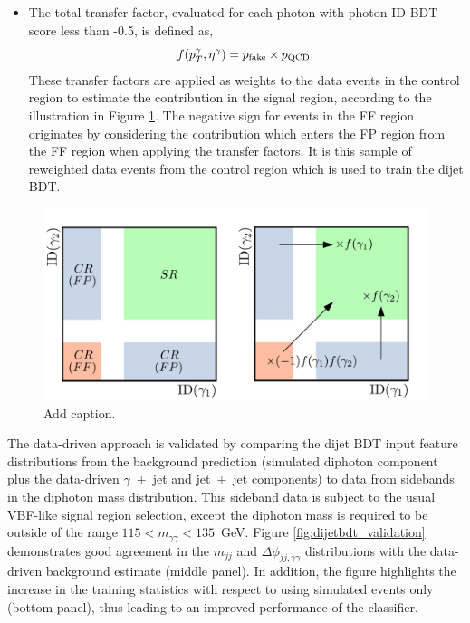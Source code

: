 \begin{itemize}
    \item The total transfer factor, evaluated for each photon with photon ID BDT score less than -0.5, is defined as,
    \begin{equation}
        f(p_T^\gamma,\eta^\gamma) = p_{\rm{fake}} \times p_{\rm{QCD}}.
    \end{equation}
    These transfer factors are applied as weights to the data events in the control region to estimate the contribution in the signal region, according to the illustration in Figure \ref{fig:dijetbdt_transferfunctions}. The negative sign for events in the FF region originates by considering the contribution which enters the FP region from the FF region when applying the transfer factors. It is this sample of reweighted data events from the control region which is used to train the dijet BDT.
\end{itemize}

\begin{figure}[hptb]
  \centering
  \includegraphics[width=1\textwidth]{Figures/hgg_overview/dijetbdt_illustration.pdf}
  \caption[Illustration of the data-driven background estimate method for the dijet BDT]
  {
    Add caption.
  }
  \label{fig:dijetbdt_transferfunctions}
\end{figure}

The data-driven approach is validated by comparing the dijet BDT input feature distributions from the background prediction (simulated diphoton component plus the data-driven $\gamma$~+~jet and jet~+~jet components) to data from sidebands in the diphoton mass distribution. This sideband data is subject to the usual VBF-like signal region selection, except the diphoton mass is required to be outside of the range $115<m_{\gamma\gamma}<135$~GeV. Figure \ref{fig:dijetbdt_validation} demonstrates good agreement in the $m_{jj}$ and $\Delta\phi_{jj,\gamma\gamma}$ distributions with the data-driven background estimate (middle panel). In addition, the figure highlights the increase in the training statistics with respect to using simulated events only (bottom panel), thus leading to an improved performance of the classifier. 

